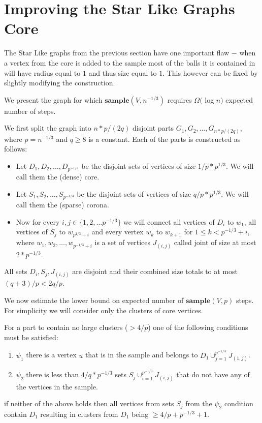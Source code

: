 \documentclass[shortabstract, lic, english]{iithesis}
\theoremstyle{definition} \newtheorem{definition}{Definition}[chapter]
\theoremstyle{remark} \newtheorem{remark}[definition]{Observation}
\theoremstyle{plain} \newtheorem{theorem}[definition]{Theorem}
\theoremstyle{plain} \newtheorem{lemma}[definition]{Lemma}
\theoremstyle{plain} \newtheorem{conjecture}[definition]{Conjecture}
\begin{document}
\section{Improving the Star Like Graphs Core}

The Star Like graphs from the previous section have one important flaw $-$
when a vertex from the core is added to the sample most of the balls it is contained in will have radius equal to $1$ and thus size equal to $1$.
This however can be fixed by slightly modifying the construction.

We present the graph for which $\mathbf{sample}(V, n^{-1/3})$ requires $\Omega($ log $n)$ expected number of steps.

We first split the graph into $n*p/(2q)$ disjoint parts $G_1, G_2, \ldots, G_{n*p/(2q)}$, where $p = n^{-1/3}$ and $q \geq 8$ is a constant.
Each of the parts is constructed as follows:
\begin{itemize}
    \item Let $D_1, D_2, \ldots, D_{p^{-1/3}}$ be the disjoint sets of vertices of size $1/p * p^{1/3}$. We will call them the (dense) core.
    \item Let $S_1, S_2, \ldots, S_{p^{-1/3}}$ be the disjoint sets of vertices of size $q/p * p^{1/3}$. We will call them the (sparse) corona.
    \item Now for every $i, j \in \{1, 2, \ldots p^{-1/3}\}$ we will connect all vertices of $D_i$ to $w_1$, all vertices of $S_j$ to $w_{p^{1/3} + i}$ and every vertex $w_k$ to $w_{k+1}$ for $1 \leq k < p^{-1/3} + i$,
            where $w_1, w_2, \ldots, w_{p^{-1/3} + i}$ is a set of vertices $J_{(i, j)}$ called joint of size at most $2 * p^{-1/3}$.
\end{itemize}
All sets $D_i, S_j, J_{(i, j)}$ are disjoint and their combined size totals to at most $(q + 3)/p < 2q/p$.

We now estimate the lower bound on expected number of $\mathbf{sample}(V, p)$ steps.
For simplicity we will consider only the clusters of core vertices.

For a part to contain no large clusters ($> 4/p$) one of the following conditions must be satisfied:
\begin{enumerate}
    \item $\psi_1$ there is a vertex $u$ that is in the sample and belongs to $D_1 \cup_{j=1}^{p^{-1/3}} J_{(1, j)}$.
    \item $\psi_2$ there is less than $4/q * p^{-1/3}$ sets $S_j \cup_{i=1}^{p^{-1/3}} J_{(i, j)}$ that do not have any of the vertices in the sample.
\end{enumerate}
if neither of the above holds then all vertices from sets $S_j$ from the $\psi_2$ condition contain $D_1$ resulting in clusters from $D_1$ being $\geq 4/p + p^{-1/3} + 1$.
\end{document}
